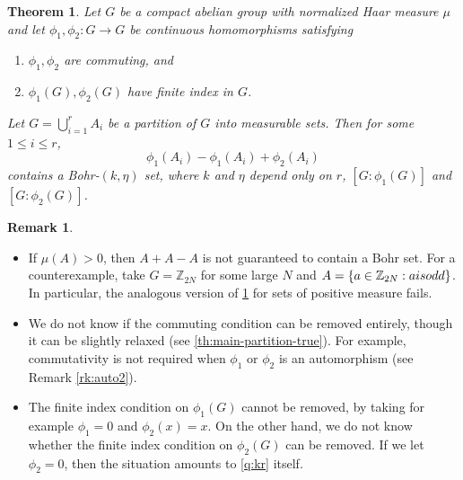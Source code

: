 \documentclass[10pt]{article}
\newtheorem{theorem}{Theorem}[section]
\theoremstyle{definition}
\newtheorem{remark}{Remark}
\newcommand{\T}{\mathbb{T}}
\newcommand{\Z}{\mathbb{Z}}
\begin{document}
\begin{theorem} \label{th:main-partition}
Let $G$ be a compact abelian group with normalized Haar measure $\mu$ and let $\phi_1, \phi_2: G \rightarrow G$ be continuous homomorphisms satisfying
\begin{enumerate}[label=(\alph*), leftmargin=*]
\item $\phi_1, \phi_2$ are commuting, and
\item $\phi_1(G), \phi_2(G)$ have finite index in $G$.
\end{enumerate} 
Let $G = \bigcup_{i=1}^r A_i$ be a partition of $G$ into measurable sets. Then for some $1 \leq i \leq r$, 
\[
\phi_1(A_i) - \phi_1(A_i) + \phi_2(A_i)
\] 
contains a Bohr-$(k, \eta)$ set, where $k$ and $\eta$ depend only on $r$, $[G:\phi_1(G)]$ and $[G:\phi_2(G)]$.
\end{theorem}
\begin{remark}\label{remark:first_one} \
\begin{itemize}[leftmargin=*]
\item If $\mu(A) >0$, then $A + A - A$ is not guaranteed to contain a Bohr set. For a counterexample, take $G = \Z_{2N}$ for some large $N$ and $A=\{a \in \Z_{2N}: a \textup{ is odd} \}$. In particular, the analogous version of \cref{th:main-partition} for sets of positive measure fails. 

\item We do not know if the commuting condition can be removed entirely, though it can be slightly relaxed (see \cref{th:main-partition-true}). For example, commutativity is not required when $\phi_1$ or $\phi_2$ is an automorphism (see Remark \ref{rk:auto2}).

\item The finite index condition on $\phi_1(G)$ cannot be removed, by taking for example $\phi_1 = 0$ and $\phi_2(x) = x$. On the other hand, we do not know whether the finite index condition on $\phi_2(G)$ can be removed. If we let $\phi_2 = 0$, then the situation amounts to \cref{q:kr} itself. 

\end{itemize}
\end{remark}
\end{document}
